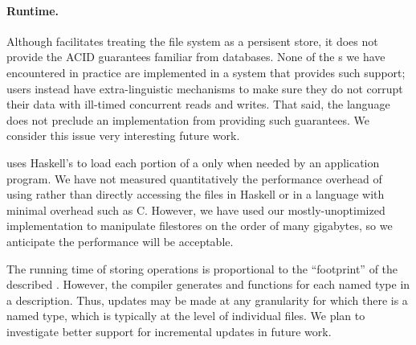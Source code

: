 \paragraph{Runtime.}
Although \forest{} facilitates treating the file system as a
persisent store, it does not provide the ACID guarantees familiar from
databases.  None of the \filestore{}s we
have encountered in practice are implemented in a system that provides
such support; users instead have extra-linguistic mechanisms to make
sure they do not corrupt their data with ill-timed concurrent reads
and writes. That said, the \forest{} language does not preclude an
implementation from providing such guarantees. We consider this issue
very interesting future work. 

\forest{} uses Haskell's  to load each portion
of a \filestore{} only when needed by an application program.
We have not measured quantitatively the performance overhead of using
\forest{} rather than directly accessing the files in Haskell or in a
language with minimal overhead such as C. However, we have used our
mostly-unoptimized implementation to manipulate filestores on the
order of many gigabytes, so we anticipate the performance will be acceptable.  

The running time of storing operations is proportional to the
``footprint'' of the described \filestore{}. However, the \forest{}
compiler generates  and  functions for each
named type in a description. Thus, updates may be made at any
granularity for which there is a named type, which is typically at the
level of individual files. We plan to investigate better support for
incremental updates in future work.



